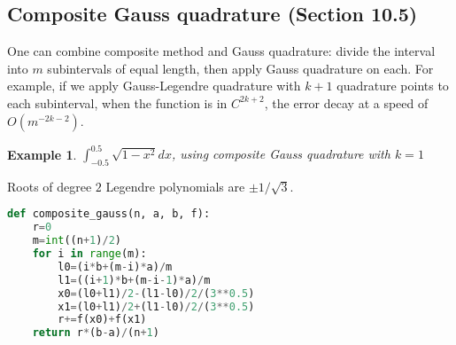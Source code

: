 \documentclass[20pt]{article} %
\theoremstyle{break}
\newtheorem{exa}[definition]{Example}
\begin{document}
\newpage

\subsection{Composite Gauss quadrature (Section 10.5)}

One can combine composite method and Gauss quadrature: divide the interval into $m$ subintervals of equal length, then apply Gauss quadrature on each. For example, if we apply Gauss-Legendre quadrature with $k+1$ quadrature points to each subinterval, when the function is in $C^{2k+2}$, the error decay at a speed of $O(m^{-2k-2})$.

\newpage

\begin{exa} $\int_{-0.5}^{0.5}\sqrt{1-x^2}dx$, using composite Gauss quadrature with $k=1$\end{exa}

Roots of degree $2$ Legendre polynomials are $\pm1/\sqrt{3}$.

\begin{lstlisting}[language=Python]
def composite_gauss(n, a, b, f):
    r=0
    m=int((n+1)/2)
    for i in range(m):
        l0=(i*b+(m-i)*a)/m
        l1=((i+1)*b+(m-i-1)*a)/m
        x0=(l0+l1)/2-(l1-l0)/2/(3**0.5)
        x1=(l0+l1)/2+(l1-l0)/2/(3**0.5)
        r+=f(x0)+f(x1)
    return r*(b-a)/(n+1)
\end{lstlisting}
\end{document}
